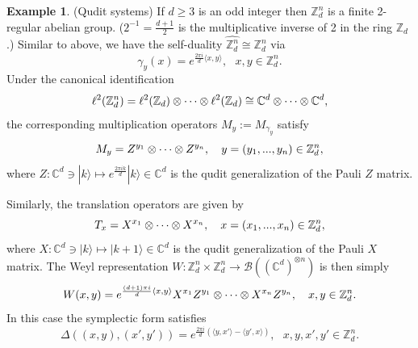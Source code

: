 \documentclass[12pt,reqno]{amsart}
\theoremstyle{definition}
\newtheorem{ex}[thm]{Example}
\theoremstyle{definition}
\theoremstyle{definition}
\numberwithin{thm}{section}
\numberwithin{equation}{section}
\newcommand{\la}{\langle}
\newcommand{\ra}{\rangle}
\newcommand{\z}{\mathbb{Z}}
\newcommand{\mc}[1]{\mathcal #1}
\newcommand{\ten}{\otimes}
\newcommand{\bC}{\mathbb{C}}
\begin{document}
\begin{ex}\label{ex:qudit} (Qudit systems) If $d\geq 3$ is an odd integer then $\z_d^n$ is a finite 2-regular abelian group. ($2^{-1}=\frac{d+1}{2}$ is the multiplicative inverse of 2 in the ring $\z_d$.) Similar to above, we have the self-duality $\widehat{\z_d^n}\cong\z_d^n$ via
\begin{equation}\label{e:char1}\gamma_y(x)=e^{\frac{2\pi i}{d}\la x,y\ra}, \ \ \ x,y\in\z_d^n.\end{equation}
Under the canonical identification 
\begin{equation}
\notag     \ell^2(\z_d^n)=\ell^2(\z_d)\ten\cdots\ten\ell^2(\z_d)\cong\bC^d\ten\cdots\ten\bC^d,
\end{equation}
the corresponding multiplication operators $M_y:=M_{\gamma_y}$ satisfy
\begin{equation}
\notag M_y=Z^{y_1}\ten\cdots\ten Z^{y_n}, \ \ \ y=(y_1,...,y_n)\in\z_d^n,
\end{equation}
where $Z:\bC^d\ni |k\ra\mapsto e^{\frac{2\pi ik}{d}}|k\ra\in\bC^d$ is the qudit generalization of the Pauli $Z$ matrix.

Similarly, the translation operators are given by
\begin{equation}
\notag T_x=X^{x_1}\ten\cdots \ten X^{x_n}, \ \ \ x=(x_1,...,x_n)\in\z_d^n,    
\end{equation}
where $X:\bC^d\ni |k\ra\mapsto |k+1\ra\in\bC^d$ is the qudit generalization of the Pauli $X$ matrix. The Weyl representation $W:\z_d^n\times\z_d^n\rightarrow\mc{B}((\bC^d)^{\ten n})$ is then simply
\begin{equation}
 \notag    W(x,y)=e^{\frac{(d+1)\pi i}{d}\la x,y\ra}X^{x_1}Z^{y_1} \ten\cdots \ten X^{x_n}Z^{y_n}, \ \ \ x,y\in\z_d^n.
\end{equation}
In this case the symplectic form satisfies
\begin{equation}
\Delta((x,y),(x',y'))=e^{\frac{2\pi i}{d}(\la y,x'\ra-\la y',x\ra)}, \ \ \ x,y,x',y'\in\z_d^n.    
\end{equation}
\end{ex}
 
\end{document}
